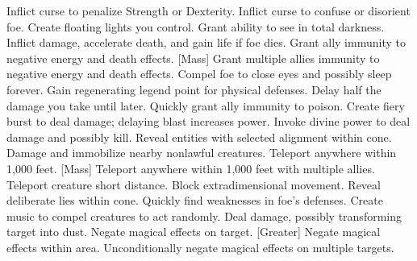     {Inflict curse to penalize Strength or Dexterity.}
    {Inflict curse to confuse or disorient foe.}
    {Create floating lights you control.}
    {Grant ability to see in total darkness.}
    {Inflict damage, accelerate death, and gain life if foe dies.}
    {Grant ally immunity to negative energy and death effects.}
[Mass]
    {Grant multiple allies immunity to negative energy and death effects.}
    {Compel foe to close eyes and possibly sleep forever.}
    {Gain regenerating legend point for physical defenses.}
    {Delay half the damage you take until later.}
    {Quickly grant ally immunity to poison.}
    {Create fiery burst to deal damage; delaying blast increases power.}
    {Invoke divine power to deal damage and possibly kill.}
    {Reveal entities with selected alignment within cone.}
    {Damage and immobilize nearby nonlawful creatures.}
    {Teleport anywhere within 1,000 feet.}
[Mass]
    {Teleport anywhere within 1,000 feet with multiple allies.}
    {Teleport creature short distance.}
    {Block extradimensional movement.}
    {Reveal deliberate lies within cone.}
    {Quickly find weaknesses in foe's defenses.}
    {Create music to compel creatures to act randomly.}
    {Deal damage, possibly transforming target into dust.}
    {Negate magical effects on target.}
[Greater]
    {Negate magical effects within area.}
    {Unconditionally negate magical effects on multiple targets.}
